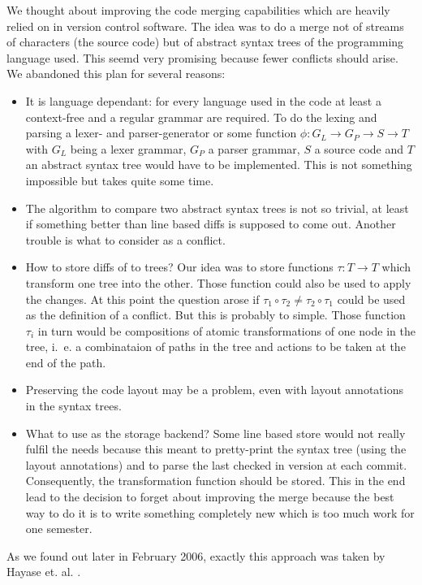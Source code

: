 \documentclass[fleqn, 10pt, a4paper]{report}
\begin{document}
We thought about improving the code merging capabilities
which are heavily relied on in version control software. The idea was to
do a merge not of streams of characters (the source code) but of
abstract syntax trees of the programming language used. This seemd very
promising because fewer conflicts should arise. We abandoned this plan
for several reasons:

\begin{itemize}
\item It is language dependant: for every language used in the code at
  least a context-free and a regular grammar are required. To do the
  lexing and parsing a lexer- and parser-generator or some function
  $\phi : G_L \rightarrow G_P \rightarrow S \rightarrow T$ with $G_L$
  being a lexer grammar, $G_P$ a parser grammar, $S$ a source code and
  $T$ an abstract syntax tree would have to be implemented. This is
  not something impossible but takes quite some time.
\item The algorithm to compare two abstract syntax trees is not so
  trivial, at least if something better than line based diffs is
  supposed to come out. Another trouble is what to consider as a
  conflict.
\item How to store diffs of to trees? Our idea was to store functions
  $\tau : T \rightarrow T$ which transform one tree into the other.
  Those function could also be used to apply the changes. At this
  point the question arose if $\tau_1 \circ \tau_2 \neq \tau_2 \circ
  \tau_1$ could be used as the definition of a conflict. But this is
  probably to simple.  Those function $\tau_i$ in turn would be
  compositions of atomic transformations of one node in the tree,
  i.~e. a combinataion of paths in the tree and actions to be taken at
  the end of the path.
\item Preserving the code layout may be a problem, even with layout
  annotations in the syntax trees.
\item What to use as the storage backend? Some line based store would
  not really fulfil the needs because this meant to pretty-print the
  syntax tree (using the layout annotations) and to parse the last
  checked in version at each commit. Consequently, the transformation
  function should be stored. This in the end lead to the decision to
  forget about improving the merge because the best way to do it is to
  write something completely new which is too much work for one
  semester.
\end{itemize}

As we found out later in February 2006, exactly this approach
was taken by Hayase et. al. \cite{HMI05}.
\end{document}
